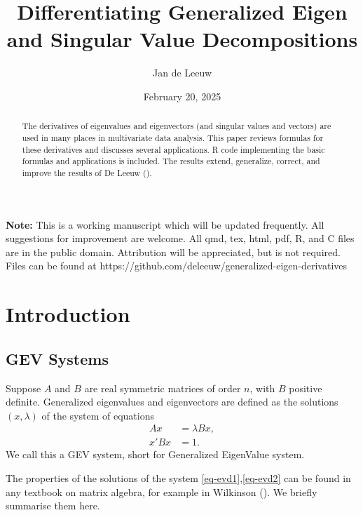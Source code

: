 \documentclass[
  12pt,
  letterpaper,
  DIV=11,
  numbers=noendperiod]{scrartcl}
\title{Differentiating Generalized Eigen and Singular Value
Decompositions}
\author{Jan de Leeuw}
\date{February 20, 2025}
\newcommand{\sectionbreak}{\clearpage}
\renewcommand*\contentsname{Table of contents}
\newcommand\contentsname{Table of contents}
\begin{document}
\maketitle
\begin{abstract}
The derivatives of eigenvalues and eigenvectors (and singular values and
vectors) are used in many places in multivariate data analysis. This
paper reviews formulas for these derivatives and discusses several
applications. R code implementing the basic formulas and applications is
included. The results extend, generalize, correct, and improve the
results of De Leeuw ().
\end{abstract}

\renewcommand*\contentsname{Table of contents}
{
\hypersetup{linkcolor=}
\setcounter{tocdepth}{3}
\tableofcontents
}

\sectionbreak

\textbf{Note:} This is a working manuscript which will be updated
frequently. All suggestions for improvement are welcome. All qmd, tex,
html, pdf, R, and C files are in the public domain. Attribution will be
appreciated, but is not required. Files can be found at
https://github.com/deleeuw/generalized-eigen-derivatives

\sectionbreak

\section{Introduction}\label{sec-intro}

\subsection{GEV Systems}\label{gev-systems}

Suppose \(A\) and \(B\) are real symmetric matrices of order \(n\), with
\(B\) positive definite. Generalized eigenvalues and eigenvectors are
defined as the solutions \((x,\lambda)\) of the system of equations
\begin{subequations}
\begin{align}
Ax&=\lambda Bx,\label{eq-evd1}\\
x'Bx&=1.\label{eq-evd2}
\end{align}
\end{subequations} We call this a GEV system, short for Generalized
EigenValue system.

The properties of the solutions of the system
\eqref{eq-evd1},\eqref{eq-evd2} can be found in any textbook on matrix
algebra, for example in Wilkinson ().
We briefly summarise them here.
\end{document}
